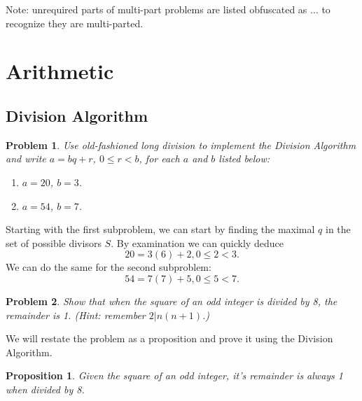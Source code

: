 \documentclass[12pt]{article}
\newtheorem*{prop}{Proposition}
\newtheorem{problem}{Problem}
\theoremstyle{remark}  %
\begin{document}
 
%
\rhead{\today}
Note: unrequired parts of multi-part problems are listed obfuscated as $\dots$ to recognize they are multi-parted.
\section{Arithmetic}
\setcounter{subsection}{2}
\subsection{Division Algorithm}

\setcounter{problem}{4}
    \begin{problem}
        Use old-fashioned long division to implement the Division Algorithm and write $a=bq+r$, $0\leq r<b$, for each $a$ and $b$ listed below:
        \begin{enumerate}[label=(\alph*)]
            \item $a=20$, $b=3$.
            \item $a=54$, $b=7$.
        \end{enumerate}
    \end{problem}
    Starting with the first subproblem, we can start by finding the maximal $q$ in the set of possible divisors $S$. By examination we can quickly deduce $$\boxed{20 = 3(6) + 2, 0 \leq 2 < 3.}$$ We can do the same for the second subproblem: $$\boxed{54 = 7(7) + 5, 0 \leq 5 < 7.}$$
\vspace{.5em}
\setcounter{problem}{7}
    \begin{problem}
        Show that when the square of an odd integer is divided by 8, the remainder is 1. (Hint: remember $2|n(n+1)$.)
    \end{problem}
    We will restate the problem as a proposition and prove it using the Division Algorithm.
    \begin{prop}
        Given the square of an odd integer, it's remainder is always 1 when divided by 8.
    \end{prop}
\end{document}
